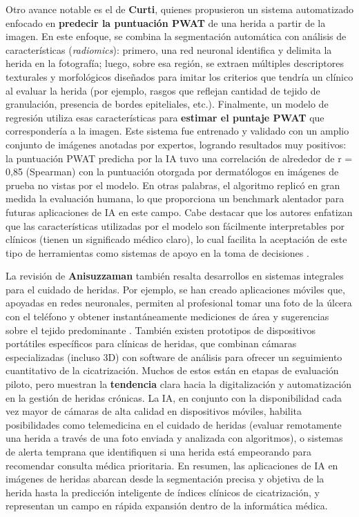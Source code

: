 Otro avance notable es el de \textbf{Curti}, quienes propusieron un sistema automatizado enfocado en \textbf{predecir la puntuación PWAT} de una herida a partir de la imagen. En este enfoque, se combina la segmentación automática con análisis de características (\textit{radiomics}): primero, una red neuronal identifica y delimita la herida en la fotografía; luego, sobre esa región, se extraen múltiples descriptores texturales y morfológicos diseñados para imitar los criterios que tendría un clínico al evaluar la herida (por ejemplo, rasgos que reflejan cantidad de tejido de granulación, presencia de bordes epiteliales, etc.). Finalmente, un modelo de regresión utiliza esas características para \textbf{estimar el puntaje PWAT} que correspondería a la imagen. Este sistema fue entrenado y validado con un amplio conjunto de imágenes anotadas por expertos, logrando resultados muy positivos: la puntuación PWAT predicha por la IA tuvo una correlación de alrededor de r = 0,85 (Spearman) con la puntuación otorgada por dermatólogos en imágenes de prueba no vistas por el modelo. En otras palabras, el algoritmo replicó en gran medida la evaluación humana, lo que proporciona un benchmark alentador para futuras aplicaciones de IA en este campo. Cabe destacar que los autores enfatizan que las características utilizadas por el modelo son fácilmente interpretables por clínicos (tienen un significado médico claro), lo cual facilita la aceptación de este tipo de herramientas como sistemas de apoyo en la toma de decisiones \cite{Curti2024}.

La revisión de \textbf{Anisuzzaman } también resalta desarrollos en sistemas integrales para el cuidado de heridas. Por ejemplo, se han creado aplicaciones móviles que, apoyadas en redes neuronales, permiten al profesional tomar una foto de la úlcera con el teléfono y obtener instantáneamente mediciones de área y sugerencias sobre el tejido predominante \cite{https://doi.org/10.48550/arxiv.2009.07141}. También existen prototipos de dispositivos portátiles específicos para clínicas de heridas, que combinan cámaras especializadas (incluso 3D) con software de análisis para ofrecer un seguimiento cuantitativo de la cicatrización. Muchos de estos están en etapas de evaluación piloto, pero muestran la \textbf{tendencia} clara hacia la digitalización y automatización en la gestión de heridas crónicas. La IA, en conjunto con la disponibilidad cada vez mayor de cámaras de alta calidad en dispositivos móviles, habilita posibilidades como telemedicina en el cuidado de heridas (evaluar remotamente una herida a través de una foto enviada y analizada con algoritmos), o sistemas de alerta temprana que identifiquen si una herida está empeorando para recomendar consulta médica prioritaria. En resumen, las aplicaciones de IA en imágenes de heridas abarcan desde la segmentación precisa y objetiva de la herida hasta la predicción inteligente de índices clínicos de cicatrización, y representan un campo en rápida expansión dentro de la informática médica.

